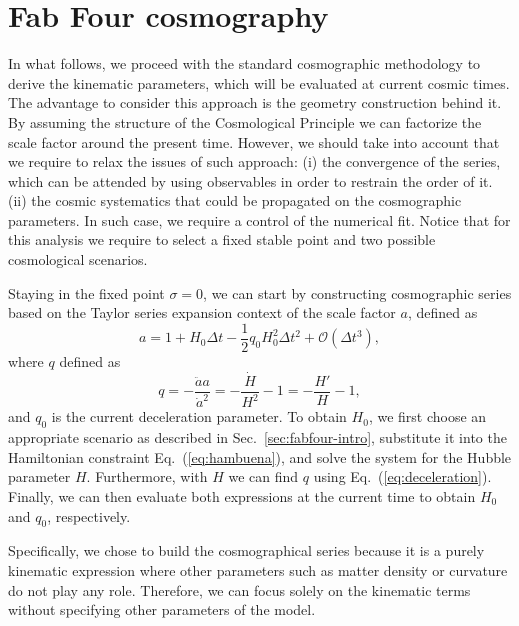 \documentclass[onecolumn,superscriptaddress,secnumarabic,amssymb,amsmath,nobibnotes,aps,prd,nofootinbib,altaffilletter]{revtex4}
\begin{document}
\section{Fab Four cosmography}
\label{sec:fabfour_cosmography}

In what follows, we proceed with the standard cosmographic methodology \cite{Bamba:2012cp,Capozziello:2019cav,Escamilla-Rivera:2019aol} to derive the kinematic parameters, which will be evaluated at current cosmic times. The advantage to consider this approach is the geometry construction behind it. By assuming the structure of the Cosmological Principle we can factorize the scale factor around the present time. However, we should take into account that we require to relax the issues of such approach: (i) the convergence of the series, which can be attended by using observables in order to restrain the order of it. (ii) the cosmic systematics that could be propagated on the cosmographic parameters. In such case, we require a control of the numerical fit.
Notice that for this analysis we require to select a fixed stable point and two possible cosmological scenarios.

Staying in the fixed point $\sigma=0$, we can start by constructing cosmographic series based on the Taylor series expansion context of the scale factor $a$, defined as
\begin{equation}
    a = 1+ H_0\Delta t - \frac{1}{2}q_0H_0^2\Delta t^2 + \mathcal{O}(\Delta t^3),
    \label{eq:cosmographical}
\end{equation}
where $q$ defined as
\begin{equation}
    q=-\frac{\ddot{a} a}{\dot{a}^2} = -\frac{\dot{H}}{H^2}-1=-\frac{H'}{H}-1   ,
    \label{eq:deceleration}
\end{equation}
and $q_0$ is the current deceleration parameter.
To obtain $H_0$, we first choose an appropriate scenario as described in Sec.~\ref{sec:fabfour-intro}, substitute it into the Hamiltonian constraint Eq.~(\ref{eq:hambuena}), and solve the system for the Hubble parameter $H$. Furthermore, with $H$ we can find $q$ using Eq.~(\ref{eq:deceleration}). Finally, we can then evaluate both expressions at the current time to obtain $H_0$ and $q_0$, respectively. 

Specifically, we chose to build the cosmographical series because it is a purely kinematic expression where other parameters such as matter density or curvature do not play any role. Therefore, we can focus solely on the kinematic terms without specifying other parameters of the model.
\end{document}

